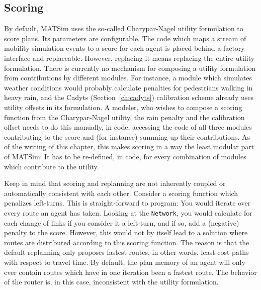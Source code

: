 \subsection{Scoring}
\label{sec:scoring-extension-point}
By default, MATSim uses the so-called Charypar-Nagel utility formulation to score plans. Its parameters are configurable.
The code which maps a stream of mobility simulation events to a score for each agent is placed behind a factory interface and replaceable. However, replacing it means replacing the entire utility formulation. There is currently no mechanism for composing a utility formulation from contributions by different modules. For instance, a module which simulates weather conditions would probably calculate penalties for pedestrians walking in heavy rain, and the Cadyts (Section~\ref{ch:cadyts}) calibration scheme already uses utility offsets in its formulation. A modeler, who wishes to compose a scoring function from the Charypar-Nagel utility, the rain penalty and the calibration offset needs to do this manually, in code, accessing the code of all three modules contributing to the score and (for instance) summing up their contributions. As of the writing of this chapter, this makes scoring in a way the least modular part of MATSim: It has to 
be re-defined, in code, for every combination of modules which contribute to the utility.

Keep in mind that scoring and replanning are not inherently coupled or automatically consistent with each other. 
Consider a scoring function which penalizes left-turns. This is straight-forward to program: You would 
iterate over every route an agent has taken. Looking at the \lstinline$Network$, you would calculate for each change of
links if you consider it a left-turn, and if so, add a (negative) penalty to the score. However, this would not by itself lead to a
solution where routes are distributed according to this scoring function. The reason is that the default replanning only proposes
 fastest routes, in other words, least-cost paths with respect to travel time. By default, the plan memory of an agent will only ever
 contain routes which have in one iteration been a fastest route. The behavior of the router is, in this case, inconsistent with the utility
 formulation.
   

